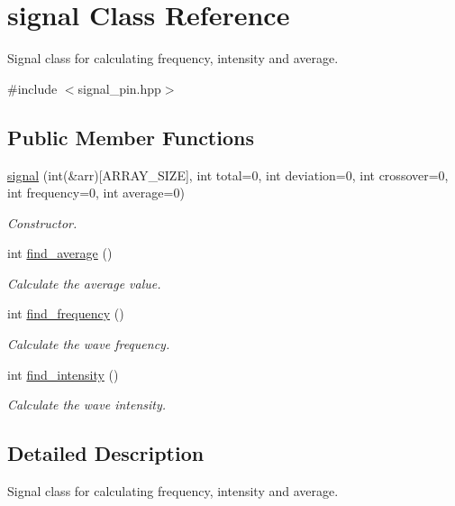 \hypertarget{classsignal}{}\section{signal Class Reference}
\label{classsignal}


Signal class for calculating frequency, intensity and average.  




{\ttfamily \#include $<$signal\+\_\+pin.\+hpp$>$}

\subsection*{Public Member Functions}
\begin{DoxyCompactItemize}
\item 
\hyperlink{classsignal_aef2d7ed4ef10ccba493fc51e05149dfd}{signal} (int(\&arr)\mbox{[}A\+R\+R\+A\+Y\+\_\+\+S\+I\+ZE\mbox{]}, int total=0, int deviation=0, int crossover=0, int frequency=0, int average=0)
\begin{DoxyCompactList}\small\item\em Constructor. \end{DoxyCompactList}\item 
int \hyperlink{classsignal_a835580fc0e7fbb50caca191ba16a9f44}{find\+\_\+average} ()
\begin{DoxyCompactList}\small\item\em Calculate the average value. \end{DoxyCompactList}\item 
int \hyperlink{classsignal_acb1ba96b02c44654da3eeb0d652e2ffa}{find\+\_\+frequency} ()
\begin{DoxyCompactList}\small\item\em Calculate the wave frequency. \end{DoxyCompactList}\item 
int \hyperlink{classsignal_a69202b08571b076c0500c230316a0b10}{find\+\_\+intensity} ()
\begin{DoxyCompactList}\small\item\em Calculate the wave intensity. \end{DoxyCompactList}\end{DoxyCompactItemize}


\subsection{Detailed Description}
Signal class for calculating frequency, intensity and average. 

